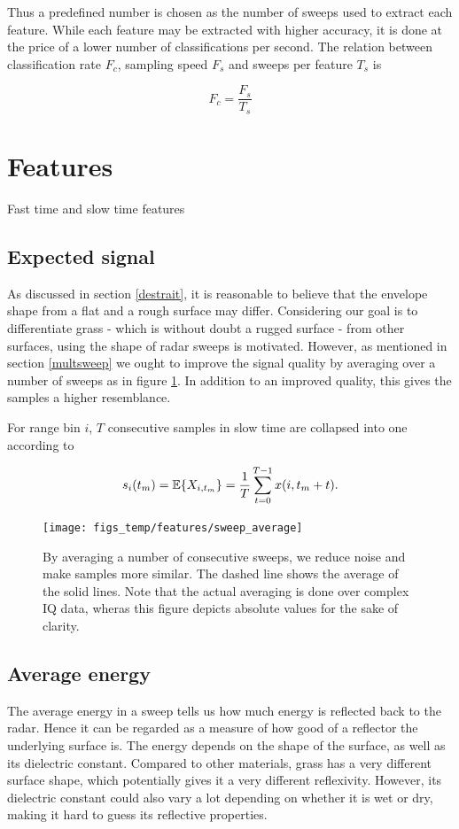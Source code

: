 Thus a predefined number is chosen as the number of sweeps used to extract each feature. While each feature may be extracted with higher accuracy, it is done at the price of a lower number of classifications per second. The relation between classification rate $F_c$, sampling speed $F_s$ and sweeps per feature $T_s$ is



\begin{equation}
	F_c = \frac{F_s}{T_s}
\end{equation}

\section{Features}

Fast time and slow time features 



\subsection{Expected signal}
As discussed in section \ref{destrait}, it is reasonable to believe that the envelope shape from a flat and a rough surface may differ. Considering our goal is to differentiate grass - which is without doubt a rugged surface - from other surfaces, using the shape of radar sweeps is motivated. However, as mentioned in section \ref{multsweep} we ought to improve the signal quality by averaging over a number of sweeps as in figure \ref{fig:sweep_average}. In addition to an improved quality, this gives the samples a higher resemblance.  

For range bin $i$, $T$ consecutive samples in slow time are collapsed into one according to

\begin{equation}
	s_i(t_m) = \operatorname*{\mathbb{E}}\{X_{i,t_m}\} = \frac{1}{T}\sum_{t=0}^{T-1}x(i, t_m + t).
\end{equation}

\begin{figure}[h]
	\centering
	\texttt{[image: figs\_temp/features/sweep\_average]}
	\caption{By averaging a number of consecutive sweeps, we reduce noise and make samples more similar. The dashed line shows the average of the solid lines. Note that the actual averaging is done over complex IQ data, wheras this figure depicts absolute values for the sake of clarity. }
	\label{fig:sweep_average}
\end{figure}

\subsection{Average energy}
The average energy in a sweep tells us how much energy is reflected back to the radar. Hence it can be regarded as a measure of how good of a reflector the underlying surface is. The energy depends on the shape of the surface, as well as its dielectric constant. Compared to other materials, grass has a very different surface shape, which potentially gives it a very different reflexivity. However, its dielectric constant could also vary a lot depending on whether it is wet or dry, making it hard to guess its reflective properties.


